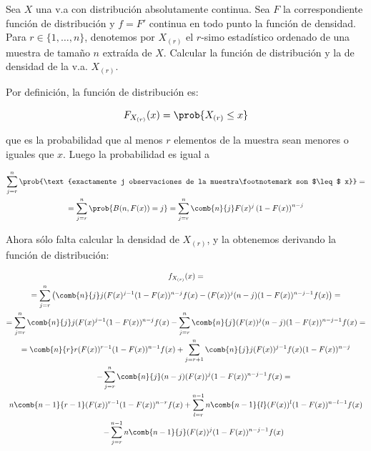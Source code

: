 \begin{problem}[7] Sea $X$ una v.a con distribución absolutamente continua. Sea $F$ la correspondiente función de distribución y $f = F'$ continua en todo punto la función de densidad. Para $r\in \{1,\dotsc,n\}$, denotemos por $X_{(r)}$ el $r$-simo estadístico ordenado de una muestra de tamaño $n$ extraída de $X$. Calcular la función de distribución y la de densidad de la v.a. $X_{(r)}$.

\solution

Por definición, la función de distribución es:

\[ F_{X_{(r)}} (x) = \prob{X_{(r)} \leq x }\]

que es la probabilidad que al menos $r$ elementos de la muestra sean menores o iguales que $x$. Luego la probabilidad es igual a

\begin{gather*}
\sum_{j=r}^n \prob{\text{exactamente j observaciones de la muestra\footnotemark son $\leq$ x}} =  \\
= \sum_{j=r}^n \prob{B(n, F(x)) = j} = \sum_{j=r}^n \comb{n}{j}F(x)^j \left(1 - F(x)\right)^{n-j}
\end{gather*}

Ahora sólo falta calcular la densidad de $X_{(r)}$, y la obtenemos derivando la función de distribución:

\newpage
\begin{gather*}
 f_{X_{(r)}} (x) = \\
 = \sum_{j=r}^n \left(\comb{n}{j}j(F(x)^{j-1}(1-F(x))^{n-j}f(x) - (F(x))^j(n-j)(1-F(x))^{n-j-1} f(x)\right) = \\
 = \sum_{j=r}^n \comb{n}{j} j(F(x)^{j-1}(1-F(x))^{n-j}f(x)  - \sum_{j=r}^n\comb{n}{j} (F(x))^j(n-j)(1-F(x))^{n-j-1} f(x) = \\
 = \comb{n}{r} r(F(x))^{r-1} (1-F(x))^{n-1}f(x) + \sum_{j=r+1}^n \comb{n}{j}j(F(x))^{j-1} f(x) (1-F(x))^{n-j} \\
 \quad \quad - \sum_{j=r}^n\comb{n}{j}(n-j)(F(x))^j (1-F(x))^{n-j-1}f(x) = \\
 n\comb{n-1}{r-1}(F(x))^{r-1} (1-F(x))^{n-r} f(x) + \sum_{l=r}^{n-1}n\comb{n-1}{l}(F(x))^l (1-F(x))^{n-l-1} f(x) \\
 \quad\quad -  \sum_{j=r}^{n-1}n\comb{n-1}{j}(F(x))^j (1-F(x))^{n-j-1} f(x)
\end{gather*} 


\end{problem}
